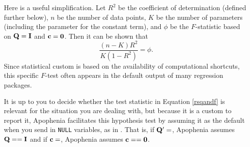 Here is a useful simplification.
Let $R^2$ be the coefficient of determination (defined further below),
$n$ be the number of data points, $K$ be the number of parameters
(including the parameter for the constant term), and $\phi$ be the
$F$-statistic
based on ${\bf Q} = {\bf I}$ and ${\bf c} = {\bf 0}$. Then it can be shown that 
\begin{equation}
\frac{(n-K) R^2}{K (1-R^2)} = \phi.    \label{rsqandf}
\end{equation}
Since statistical custom is based on the availability of computational
shortcuts, this specific $F$-test often appears in the default output
of many regression packages.  


It is up to you
to decide whether the test statistic in Equation \ref{rsqandf} is
relevant for the situation you are dealing with, but because it
is a custom to report it, Apophenia facilitates this hypothesis
test by assuming it as the default when you send in {\tt NULL}
variables, as in . That is,
if ${\bf Q}'=$, Apophenia assumes ${\bf Q}=={\bf I}$ and if
${\bf c}=$, Apophenia assumes ${\bf c} == {\bf 0}$.





